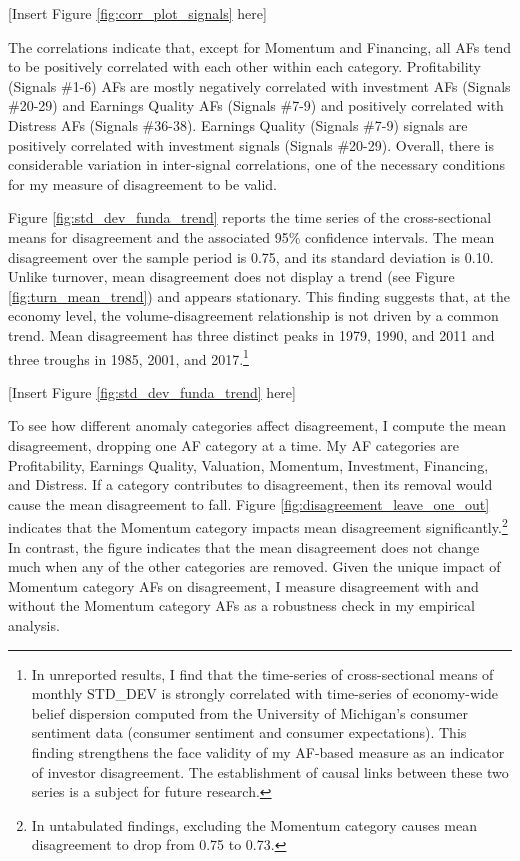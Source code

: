 \documentclass[
  12pt,
  a4paper,
  twoside,
  onecolumn]{article}
\begin{document}
\begin{center} { [Insert Figure \ref{fig:corr_plot_signals} here] } \end{center}

The correlations indicate that, except for Momentum and Financing, all
AFs tend to be positively correlated with each other within each
category. Profitability (Signals \#1-6) AFs are mostly negatively
correlated with investment AFs (Signals \#20-29) and Earnings Quality
AFs (Signals \#7-9) and positively correlated with Distress AFs (Signals
\#36-38). Earnings Quality (Signals \#7-9) signals are positively
correlated with investment signals (Signals \#20-29). Overall, there is
considerable variation in inter-signal correlations, one of the
necessary conditions for my measure of disagreement to be valid.

Figure \ref{fig:std_dev_funda_trend} reports the time series of the
cross-sectional means for disagreement and the associated 95\%
confidence intervals. The mean disagreement over the sample period is
0.75, and its standard deviation is 0.10. Unlike turnover, mean
disagreement does not display a trend (see Figure
\ref{fig:turn_mean_trend}) and appears stationary. This finding suggests
that, at the economy level, the volume-disagreement relationship is not
driven by a common trend. Mean disagreement has three distinct peaks in
1979, 1990, and 2011 and three troughs in 1985, 2001, and
2017.\footnote{In unreported results, I find that the time-series of
  cross-sectional means of monthly STD\_DEV is strongly correlated with
  time-series of economy-wide belief dispersion computed from the
  University of Michigan's consumer sentiment data (consumer sentiment
  and consumer expectations). This finding strengthens the face validity
  of my AF-based measure as an indicator of investor disagreement. The
  establishment of causal links between these two series is a subject
  for future research.}

\begin{center} { [Insert Figure \ref{fig:std_dev_funda_trend} here] } \end{center}

To see how different anomaly categories affect disagreement, I compute
the mean disagreement, dropping one AF category at a time. My AF
categories are Profitability, Earnings Quality, Valuation, Momentum,
Investment, Financing, and Distress. If a category contributes to
disagreement, then its removal would cause the mean disagreement to
fall. Figure \ref{fig:disagreement_leave_one_out} indicates that the
Momentum category impacts mean disagreement significantly.\footnote{In
  untabulated findings, excluding the Momentum category causes mean
  disagreement to drop from 0.75 to 0.73.} In contrast, the figure
indicates that the mean disagreement does not change much when any of
the other categories are removed. Given the unique impact of Momentum
category AFs on disagreement, I measure disagreement with and without
the Momentum category AFs as a robustness check in my empirical
analysis.
\end{document}
